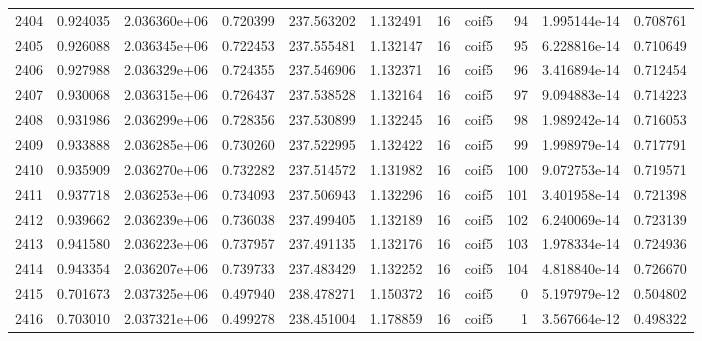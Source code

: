 \begin{tabular}{lrrrrrrlrrr}
2404 &    0.924035 &        2.036360e+06 &  0.720399 &              237.563202 &    1.132491 &      16 &        coif5 &     94 &   1.995144e-14 &      0.708761 \\
2405 &    0.926088 &        2.036345e+06 &  0.722453 &              237.555481 &    1.132147 &      16 &        coif5 &     95 &   6.228816e-14 &      0.710649 \\
2406 &    0.927988 &        2.036329e+06 &  0.724355 &              237.546906 &    1.132371 &      16 &        coif5 &     96 &   3.416894e-14 &      0.712454 \\
2407 &    0.930068 &        2.036315e+06 &  0.726437 &              237.538528 &    1.132164 &      16 &        coif5 &     97 &   9.094883e-14 &      0.714223 \\
2408 &    0.931986 &        2.036299e+06 &  0.728356 &              237.530899 &    1.132245 &      16 &        coif5 &     98 &   1.989242e-14 &      0.716053 \\
2409 &    0.933888 &        2.036285e+06 &  0.730260 &              237.522995 &    1.132422 &      16 &        coif5 &     99 &   1.998979e-14 &      0.717791 \\
2410 &    0.935909 &        2.036270e+06 &  0.732282 &              237.514572 &    1.131982 &      16 &        coif5 &    100 &   9.072753e-14 &      0.719571 \\
2411 &    0.937718 &        2.036253e+06 &  0.734093 &              237.506943 &    1.132296 &      16 &        coif5 &    101 &   3.401958e-14 &      0.721398 \\
2412 &    0.939662 &        2.036239e+06 &  0.736038 &              237.499405 &    1.132189 &      16 &        coif5 &    102 &   6.240069e-14 &      0.723139 \\
2413 &    0.941580 &        2.036223e+06 &  0.737957 &              237.491135 &    1.132176 &      16 &        coif5 &    103 &   1.978334e-14 &      0.724936 \\
2414 &    0.943354 &        2.036207e+06 &  0.739733 &              237.483429 &    1.132252 &      16 &        coif5 &    104 &   4.818840e-14 &      0.726670 \\
2415 &    0.701673 &        2.037325e+06 &  0.497940 &              238.478271 &    1.150372 &      16 &        coif5 &      0 &   5.197979e-12 &      0.504802 \\
2416 &    0.703010 &        2.037321e+06 &  0.499278 &              238.451004 &    1.178859 &      16 &        coif5 &      1 &   3.567664e-12 &      0.498322 \\

\end{tabular}
